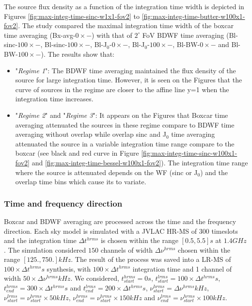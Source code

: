 \documentclass[useAMS,usenatbib]{mn2e}
\begin{document}
The source flux density as a function of the integration time width is depicted in Figures \ref{fig:max-integ-time-sinc-w1x1-fov2} to 
 \ref{fig:max-integ-time-butter-w100x1-fov2}. The study compared the maximal integration time width of the boxcar time  averaging 
(Bx-avg-$0\times -$) 
with that of  $2^{\circ}$ FoV BDWF time averaging (Bl-sinc-$100\times -$, Bl-sinc-$100\times -$, Bl-J$_0$-$0\times -$, 
Bl-J$_0$-$100\times-$, Bl-BW-$0\times -$ and Bl-BW-$100\times -$). 
The results show that:
\begin{itemize}
 \item "\textit{Regime 1}":  The BDWF time averaging maintained the flux density of the source for large integration time. 
However, 
it is seen on the Figures that the curve of sources in the regime are closer to the affine line y=1 when the integration time increases.
 \item  "\textit{Regime 2}" and "\textit{Regime 3}": It appears on the Figures that Boxcar time averaging attenuated the sources in 
these regime compare to BDWF time averaging without overlap while overlap sinc and J$_0$ time averaging attenuated the source in a variable 
integration time range compare to the boxcar (see black and red curve in Figure \ref{fig:max-integ-time-sinc-w100x1-fov2} and 
\ref{fig:max-integ-time-bessel-w100x1-fov2}). The integration time range where the source is attenuated  depends on the 
WF (sinc or J$_0$) and the overlap time bins which cause its to variate. 
\end{itemize}
\subsubsection{Time and frequency direction}
Boxcar and BDWF averaging are processed across the time and the frequency direction.
Each sky model is simulated with a JVLAC HR-MS of $300$ timeslots and  the integration time $\Delta 
t^{hrms}$ is chosen within the range $[0.5,5.5]s$ at $1.4GHz$. The simulation considered $150$ channels of width $\Delta 
\nu^{hrms}$  chosen within the range $[125.,750.]kHz$.  The result of the process was saved into a LR-MS of  $100\times\Delta t^{hrms}s$ 
synthesis, with 
$100\times\Delta t^{hrms}$ integration time and 1 channel of width $50\times\Delta \nu^{hrms}kHz$.  We considered, 
$t^{hrms}_{start}=0s$, $t^{lrms}_{start}=100\times\Delta t^{hrms} s$, $t^{hrms}_{end}=300\times\Delta t^{hrms}s$ and 
$t^{lrms}_{end}=200\times\Delta t^{hrms}s$, $\nu^{hrms}_{start}=\Delta 
\nu^{hrms}kHz$, $\nu^{lrms}_{start}=\nu^{hrms}_{start}\times50 kHz$, $\nu^{hrms}_{end}=\nu^{hrms}_{start}\times150 kHz$ and 
$\nu^{lrms}_{end}=\nu^{hrms}_{start}\times100 kHz$.
\end{document}
